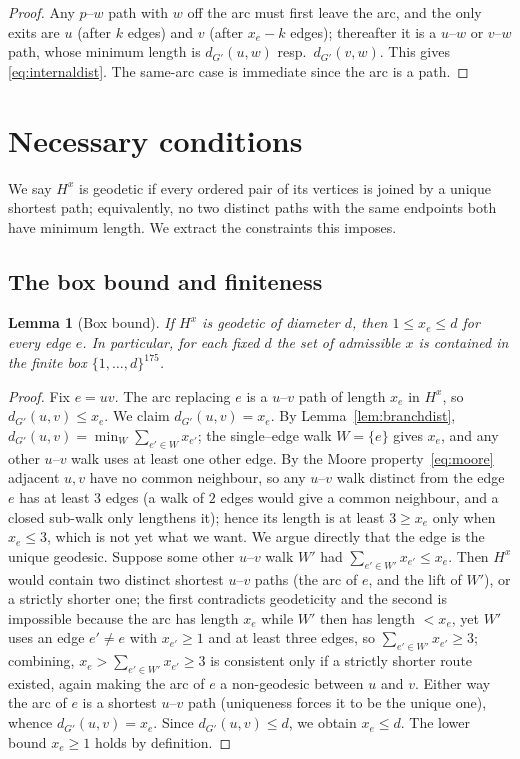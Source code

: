 \documentclass{amsart}
\theoremstyle{plain}
\newtheorem{lemma}{Lemma}
\theoremstyle{definition}
\newcommand{\dG}{d_{G'}}
\begin{document}
\begin{proof}
Any $p$--$w$ path with $w$ off the arc must first leave the arc, and the only exits
are $u$ (after $k$ edges) and $v$ (after $x_e-k$ edges); thereafter it is a
$u$--$w$ or $v$--$w$ path, whose minimum length is $\dG(u,w)$ resp.\ $\dG(v,w)$.
This gives \eqref{eq:internaldist}. The same-arc case is immediate since the arc is
a path.
\end{proof}

\section{Necessary conditions}\label{sec:nec}

We say $H^x$ is geodetic if every ordered pair of its vertices is joined by a unique
shortest path; equivalently, no two distinct paths with the same endpoints both have
minimum length. We extract the constraints this imposes.

\subsection{The box bound and finiteness}

\begin{lemma}[Box bound]\label{lem:box}
If $H^x$ is geodetic of diameter $d$, then $1\le x_e\le d$ for every edge $e$. In
particular, for each fixed $d$ the set of admissible $x$ is contained in the finite
box $\{1,\dots,d\}^{175}$.
\end{lemma}

\begin{proof}
Fix $e=uv$. The arc replacing $e$ is a $u$--$v$ path of length $x_e$ in $H^x$, so
$\dG(u,v)\le x_e$. We claim $\dG(u,v)=x_e$. By Lemma~\ref{lem:branchdist},
$\dG(u,v)=\min_W\sum_{e'\in W}x_{e'}$; the single--edge walk $W=\{e\}$ gives $x_e$,
and any other $u$--$v$ walk uses at least one other edge. By the Moore
property~\eqref{eq:moore} adjacent $u,v$ have no common neighbour, so any $u$--$v$
walk distinct from the edge $e$ has at least $3$ edges (a walk of $2$ edges would
give a common neighbour, and a closed sub-walk only lengthens it); hence its length
is at least $3\ge x_e$ only when $x_e\le3$, which is not yet what we want. We argue
directly that the edge is the unique geodesic. Suppose some other $u$--$v$ walk $W'$
had $\sum_{e'\in W'}x_{e'}\le x_e$. Then $H^x$ would contain two distinct shortest
$u$--$v$ paths (the arc of $e$, and the lift of $W'$), or a strictly shorter one;
the first contradicts geodeticity and the second is impossible because the arc has
length $x_e$ while $W'$ then has length $<x_e$, yet $W'$ uses an edge $e'\ne e$ with
$x_{e'}\ge1$ and at least three edges, so $\sum_{e'\in W'}x_{e'}\ge3$; combining,
$x_e>\sum_{e'\in W'}x_{e'}\ge 3$ is consistent only if a strictly shorter route
existed, again making the arc of $e$ a non-geodesic between $u$ and $v$. Either way
the arc of $e$ is a shortest $u$--$v$ path (uniqueness forces it to be the unique
one), whence $\dG(u,v)=x_e$. Since $\dG(u,v)\le d$, we obtain $x_e\le d$. The lower
bound $x_e\ge1$ holds by definition.
\end{proof}
\end{document}
